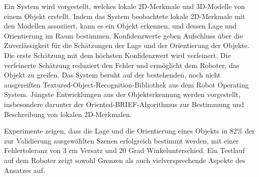 Ein System wird vorgestellt, welches lokale 2D-Merkmale und 3D-Modelle von
einem Objekt erstellt. Indem das System beobachtete lokale 2D-Merkmale mit den Modellen
assoziiert, kann es ein Objekt erkennen, und dessen Lage und Orientierung im
Raum bestimmen. Konfidenzwerte geben Aufschluss über die Zuverlässigkeit für
die Schätzungen der Lage und der Orientierung der Objekte.  Die erste Schätzung
mit dem höchsten Konfidenzwert wird verfeinert. Die verfeinerte Schätzung
reduziert den Fehler und ermöglicht dem Roboter, das Objekt zu greifen. Das
System beruht auf der bestehenden, noch nicht ausgereiften
Textured-Object-Recognition-Bibliothek aus dem Robot Operating System.  Jüngste
Entwicklungen aus der Objekterkennung werden vorgestellt, insbesondere darunter
der Oriented-BRIEF-Algorithmus zur Bestimmung und Beschreibung von lokalen
2D-Merkmalen.

Experimente zeigen, dass die Lage und die Orientierung eines Objekts in 82\%
der zur Validierung ausgewählten Szenen erfolgreich bestimmt werden, mit einer
Fehlertoleranz von 3 cm Versatz und 20 Grad Winkelunterschied. Ein Testlauf auf
dem Roboter zeigt sowohl Grenzen als auch vielversprechende Aspekte des
Ansatzes auf.

